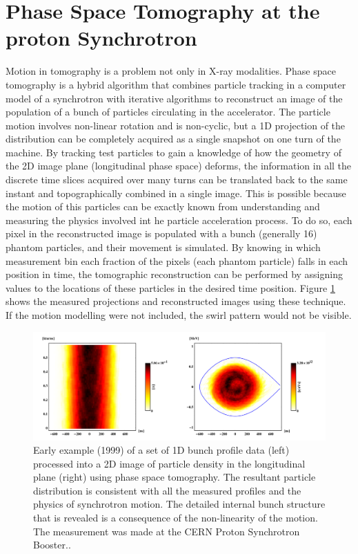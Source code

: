 \section{Phase Space Tomography at the proton Synchrotron}

Motion in tomography is a problem not only in X-ray modalities. Phase space tomography is a hybrid algorithm that combines particle tracking in a computer model of a synchrotron with iterative algorithms to reconstruct an image of the population of a bunch of particles circulating in the accelerator. The particle motion involves non-linear rotation and is non-cyclic, but a 1D projection of the distribution can be completely acquired as a single snapshot on one turn of the machine. By tracking test particles to gain a knowledge of how the geometry of the 2D image plane (longitudinal phase space) deforms, the information in all the discrete time slices acquired over many turns can be translated back to the same instant and topographically combined in a single image. This is possible because the motion of this particles can be exactly known from understanding and measuring the physics involved int he particle acceleration process. To do so, each pixel in the reconstructed image is populated with a bunch (generally 16) phantom particles, and their movement is simulated. By knowing in which measurement bin each fraction of the pixels (each phantom particle) falls in each position in time, the tomographic reconstruction can be performed by assigning values to the locations of these particles in the desired time position. Figure \ref{fig:PST} shows the measured projections and reconstructed images using these technique. If the motion modelling were not included, the swirl pattern would not be visible.

\begin{figure}

\begin{center} 

\includegraphics[width=\linewidth]{StateOfArt/Tosca2016fig.png} 

\caption[Phase space tomography]{\label{fig:PST} Early example (1999) of a set of 1D bunch profile data (left) processed into a 2D image of particle density in the longitudinal plane (right) using phase space tomography.  The resultant particle distribution is consistent with all the measured profiles and the physics of synchrotron motion.  The detailed internal bunch structure that is revealed is a consequence of the non-linearity of the motion.  The measurement was made at the CERN Proton Synchrotron Booster.\cite{pstweb}.} 
\end{center} 
\end{figure}


